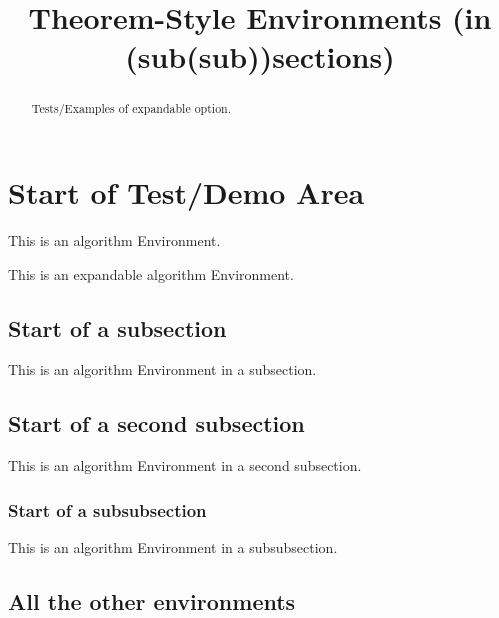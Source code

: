 \documentclass{ximera}
\title{Theorem-Style Environments (in (sub(sub))sections)}
\begin{document}
\begin{abstract}
    Tests/Examples of expandable option.
\end{abstract}
\maketitle



\section{Start of Test/Demo Area}
\begin{algorithm}
    This is an algorithm Environment.
\end{algorithm}

\begin{algorithm}
    This is an expandable algorithm Environment.
\end{algorithm}

\subsection{Start of a subsection}
\begin{algorithm}
    This is an algorithm Environment in a subsection.
\end{algorithm}

\subsection{Start of a second subsection}
\begin{algorithm}
    This is an algorithm Environment in a second subsection.
\end{algorithm}

\subsubsection{Start of a subsubsection}
\begin{algorithm}
    This is an algorithm Environment in a subsubsection.
\end{algorithm}

\subsection{All the other environments}
\end{document}
